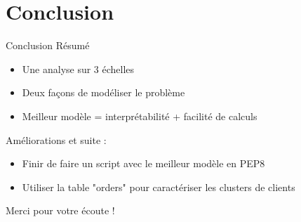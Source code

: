 \documentclass[10pt]{beamer}
\begin{document}
\section{Conclusion}
\begin{frame}{Conclusion}
    Résumé
    \begin{itemize}
        \item Une analyse sur 3 échelles
        \item Deux façons de modéliser le problème
        \item Meilleur modèle = interprétabilité + facilité de calculs
    \end{itemize} 
    \vspace{0.2cm} 
    Améliorations et suite :
    \begin{itemize}
        \item Finir de faire un script avec le meilleur modèle en PEP8
        \item Utiliser la table "orders" pour caractériser les clusters de clients 
    \end{itemize}
    \vspace{0.5cm}
    \begin{center}
        {\Huge Merci pour votre écoute !}
    \end{center}
\end{frame}
\end{document}
